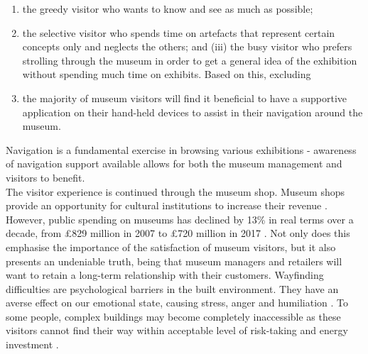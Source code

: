\begin{enumerate}
\item the greedy visitor who wants to know and see as much as possible;
\item the selective visitor who spends time on artefacts that represent certain concepts only and neglects the others; and (iii) the busy visitor who prefers strolling through the museum in order to get a general idea of the exhibition without spending much time on exhibits. Based on this, excluding  
\item the majority of museum visitors will find it beneficial to have a supportive application on their hand-held devices to assist in their navigation around the museum.
\end{enumerate}
Navigation is a fundamental exercise in browsing various exhibitions - awareness of navigation support available allows for both the museum management and visitors to benefit.\\

The visitor experience is continued through the museum shop. Museum shops provide an opportunity for cultural institutions to increase their revenue \cite{murphy}. However, public spending on museums has declined by 13\% in real terms over a decade, from £829 million in 2007 to £720 million in 2017 \cite{pickford}. Not only does this emphasise the importance of the satisfaction of museum visitors, but it also presents an undeniable truth, being that museum managers and retailers will want to retain a long-term relationship with their customers. Wayfinding difficulties are psychological barriers in the built environment. They have an averse effect on our emotional state, causing stress, anger and humiliation \cite{Ecology}. To some people, complex buildings may become completely inaccessible as these visitors cannot find their way within acceptable level of risk-taking and energy investment \cite{Wayfinding}. 

